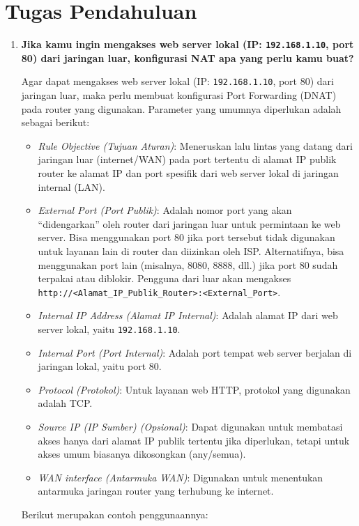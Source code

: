 \section{Tugas Pendahuluan}
\begin{enumerate}
    \item \textbf{Jika kamu ingin mengakses web server lokal (IP: \texttt{192.168.1.10}, port 80) dari jaringan luar, konfigurasi NAT apa yang perlu kamu buat?}
    
    Agar dapat mengakses web server lokal (IP: \texttt{192.168.1.10}, port 80) dari jaringan luar, maka perlu membuat konfigurasi Port Forwarding (DNAT) pada router yang digunakan. Parameter yang umumnya diperlukan adalah sebagai berikut:
    \begin{itemize}
        \item \textit{Rule Objective (Tujuan Aturan)}: Meneruskan lalu lintas yang datang dari jaringan luar (internet/WAN) pada port tertentu di alamat IP publik router ke alamat IP dan port spesifik dari web server lokal di jaringan internal (LAN).
        \item \textit{External Port (Port Publik)}: Adalah nomor port yang akan ``didengarkan'' oleh router dari jaringan luar untuk permintaan ke web server. Bisa menggunakan port 80 jika port tersebut tidak digunakan untuk layanan lain di router dan diizinkan oleh ISP. Alternatifnya, bisa menggunakan port lain (misalnya, 8080, 8888, dll.) jika port 80 sudah terpakai atau diblokir. Pengguna dari luar akan mengakses \texttt{http://\textless{}Alamat\_IP\_Publik\_Router\textgreater{}:\textless{}External\_Port\textgreater{}}.
        \item \textit{Internal IP Address (Alamat IP Internal)}: Adalah alamat IP dari web server lokal, yaitu \texttt{192.168.1.10}.
        \item \textit{Internal Port (Port Internal)}: Adalah port tempat web server berjalan di jaringan lokal, yaitu port 80.
        \item \textit{Protocol (Protokol)}: Untuk layanan web HTTP, protokol yang digunakan adalah TCP.
        \item \textit{Source IP (IP Sumber) (Opsional)}: Dapat digunakan untuk membatasi akses hanya dari alamat IP publik tertentu jika diperlukan, tetapi untuk akses umum biasanya dikosongkan (any/semua).
        \item \textit{WAN interface (Antarmuka WAN)}: Digunakan untuk menentukan antarmuka jaringan router yang terhubung ke internet.
    \end{itemize}
    Berikut merupakan contoh penggunaannya:
    

\end{enumerate}
